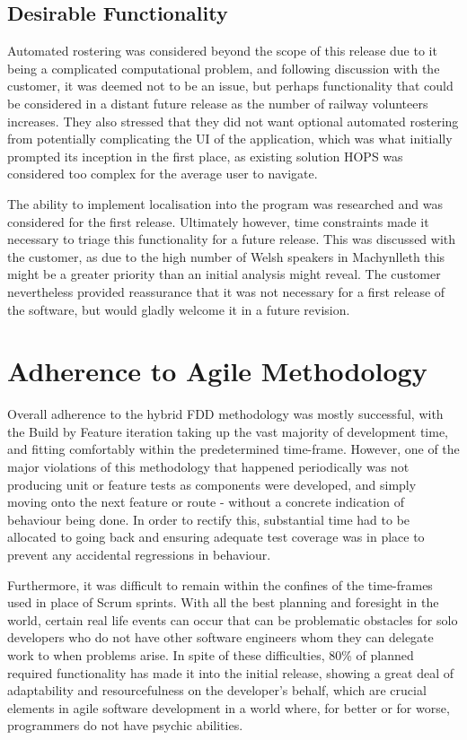 \subsection{Desirable Functionality}

Automated rostering was considered beyond the scope of this release due to it being a complicated computational problem, and following discussion with the customer, it was deemed not to be an issue, but perhaps functionality that could be considered in a distant future release as the number of railway volunteers increases. They also stressed that they did not want optional automated rostering from potentially complicating the UI of the application, which was what initially prompted its inception in the first place, as existing solution HOPS was considered too complex for the average user to navigate.

The ability to implement localisation into the program was researched and was considered for the first release. Ultimately however, time constraints made it necessary to triage this functionality for a future release. This was discussed with the customer, as due to the high number of Welsh speakers in Machynlleth \cite{Census1} this might be a greater priority than an initial analysis might reveal. The customer nevertheless provided reassurance that it was not necessary for a first release of the software, but would gladly welcome it in a future revision.

\section{Adherence to Agile Methodology}
Overall adherence to the hybrid FDD methodology was mostly successful, with the Build by Feature iteration taking up the vast majority of development time, and fitting comfortably within the predetermined time-frame. However, one of the major violations of this methodology that happened periodically was not producing unit or feature tests as components were developed, and simply moving onto the next feature or route - without a concrete indication of behaviour being done. In order to rectify this, substantial time had to be allocated to going back and ensuring adequate test coverage was in place to prevent any accidental regressions in behaviour.

Furthermore, it was difficult to remain within the confines of the time-frames used in place of Scrum sprints. With all the best planning and foresight in the world, certain real life events can occur that can be problematic obstacles for solo developers who do not have other software engineers whom they can delegate work to when problems arise. In spite of these difficulties, 80\% of planned required functionality has made it into the initial release, showing a great deal of adaptability and resourcefulness on the developer's behalf, which are crucial elements in agile software development in a world where, for better or for worse, programmers do not have psychic abilities.

